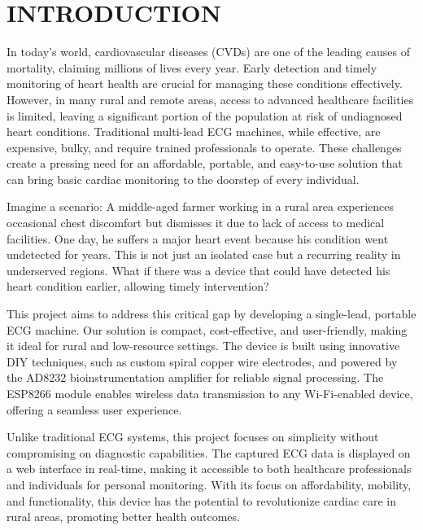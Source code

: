 \linespread{1.3}
\chapter{ INTRODUCTION}
\vspace{0.5cm}
In today’s world, cardiovascular diseases (CVDs) are one of the leading causes of mortality, claiming millions of lives every year. Early detection and timely monitoring of heart health are crucial for managing these conditions effectively. However, in many rural and remote areas, access to advanced healthcare facilities is limited, leaving a significant portion of the population at risk of undiagnosed heart conditions. Traditional multi-lead ECG machines, while effective, are expensive, bulky, and require trained professionals to operate\cite{Arias2016}. These challenges create a pressing need for an affordable, portable, and easy-to-use solution that can bring basic cardiac monitoring to the doorstep of every individual.

Imagine a scenario: A middle-aged farmer working in a rural area experiences occasional chest discomfort but dismisses it due to lack of access to medical facilities. One day, he suffers a major heart event because his condition went undetected for years. This is not just an isolated case but a recurring reality in underserved regions. What if there was a device that could have detected his heart condition earlier, allowing timely intervention?  

This project aims to address this critical gap by developing a single-lead, portable ECG machine. Our solution is compact, cost-effective, and user-friendly, making it ideal for rural and low-resource settings. The device is built using innovative DIY techniques, such as custom spiral copper wire electrodes, and powered by the AD8232 bioinstrumentation amplifier for reliable signal processing\cite{Parker2019}. The ESP8266 module enables wireless data transmission to any Wi-Fi-enabled device, offering a seamless user experience.  

Unlike traditional ECG systems, this project focuses on simplicity without compromising on diagnostic capabilities. The captured ECG data is displayed on a web interface in real-time, making it accessible to both healthcare professionals and individuals for personal monitoring. With its focus on affordability, mobility, and functionality, this device has the potential to revolutionize cardiac care in rural areas, promoting better health outcomes.  

